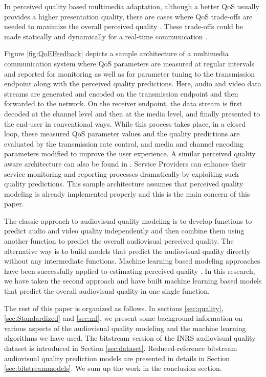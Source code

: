 \documentclass[journal]{IEEEtran}
\begin{document}
In perceived quality based multimedia adaptation, although a better QoS usually provides a higher presentation quality, there are cases where QoS trade-offs are needed to maximize the overall perceived quality \cite{hansen2013assessing}. These trade-offs could be made statically and dynamically for a real-time communication \cite{qadir2015novel}.

Figure \ref{fig:QoEFeedback} depicts a sample architecture of a multimedia communication system where QoS parameters are measured at regular intervals and reported for monitoring as well as for parameter tuning to the transmission endpoint along with the perceived quality predictions. Here, audio and video data streams are generated and encoded on the transmission endpoint and then forwarded to the network. On the receiver endpoint, the data stream is first decoded at the channel level and then at the media level, and finally presented to the end-user in conventional ways. While this process takes place, in a closed loop, these measured QoS parameter values and the quality predictions are evaluated by the transmission rate control, and media and channel encoding parameters modified to improve the user experience. A similar perceived quality aware architecture can also be found in \cite{yuan2015beyond}. Service Providers can enhance their service monitoring and reporting processes dramatically by exploiting such quality predictions. This sample architecture assumes that perceived quality modeling is already implemented properly and this is the main concern of this paper.

The classic approach to audiovisual quality modeling is to develop functions to predict audio and video quality independently and then combine them using another function to predict the overall audiovisual perceived quality. The alternative way is to build models that predict the audiovisual quality directly without any intermediate functions. Machine learning based modeling approaches have been successfully applied to estimating perceived quality \cite{aroussi2014survey} \cite{maki2013reduced}. In this research, we have taken the second approach and have built machine learning based models that predict the overall audiovisual quality in one single function.

The rest of this paper is organized as follows. In sections \ref{sec:quality}, \ref{sec:Standardized} and \ref{sec:ml}, we present some background information on various aspects of the audiovisual quality modeling and the machine learning algorithms we have used. The bitstream version of the INRS audiovisual quality dataset is introduced in Section \ref{sec:dataset}. Reduced-reference bitstream audiovisual quality prediction models are presented in details in Section \ref{sec:bitstreammodels}. We sum up the work in the conclusion section.
\end{document}
